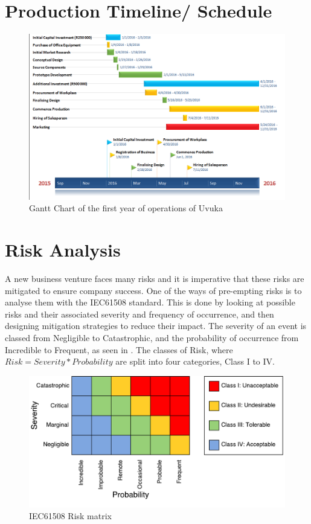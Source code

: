 \section{Production Timeline/ Schedule}
\begin{figure}[H]
\centering
\includegraphics[width=1\textwidth]{images/Gantt_2016.PNG}
\vskip10pt
\caption[Gantt Chart of the first year of operations of Uvuka]{Gantt Chart of the first year of operations of Uvuka}
\label{fig:Gantt Chart 1}
\end{figure}

\newpage 
\section{Risk Analysis}
A new business venture faces many risks and it is imperative that these risks are mitigated to ensure company success. One of the ways of pre-empting risks is to analyse them with the IEC61508 standard. This is done by looking at possible risks and their associated severity and frequency of occurrence, and then designing mitigation strategies to reduce their impact. The severity of an event is classed from Negligible to Catastrophic, and the probability of occurrence from Incredible to Frequent, as seen in . The classes of Risk, where $Risk = Severity * Probability$ are split into four categories, Class I to IV.

\begin{figure}[H]
\centering
\includegraphics[width=1\textwidth]{images/risktable}
\vskip10pt
\caption{IEC61508 Risk matrix}
\label{fig:risktable}
\end{figure}

